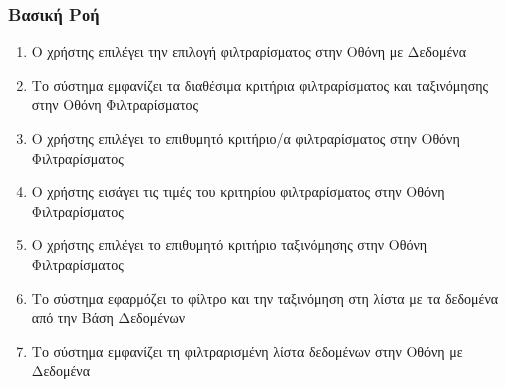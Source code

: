 \documentclass[12pt,a4paper,twoside]{book}
\begin{document}
\subsubsection{Βασική Ροή}
\begin{enumerate}
  \item Ο χρήστης επιλέγει την επιλογή φιλτραρίσματος στην Οθόνη με Δεδομένα %
  \item Το σύστημα εμφανίζει τα διαθέσιμα κριτήρια φιλτραρίσματος και ταξινόμησης στην Οθόνη Φιλτραρίσματος %
  \item Ο χρήστης επιλέγει το επιθυμητό κριτήριο/α φιλτραρίσματος στην Οθόνη Φιλτραρίσματος
  \item Ο χρήστης εισάγει τις τιμές του κριτηρίου φιλτραρίσματος στην Οθόνη Φιλτραρίσματος
  \item Ο χρήστης επιλέγει το επιθυμητό κριτήριο ταξινόμησης στην Οθόνη Φιλτραρίσματος
  \item Το σύστημα εφαρμόζει το φίλτρο και την ταξινόμηση στη λίστα με τα δεδομένα από την Βάση Δεδομένων %
  \item Το σύστημα εμφανίζει τη φιλτραρισμένη λίστα δεδομένων στην Οθόνη με Δεδομένα %
\end{enumerate}
\end{document}
